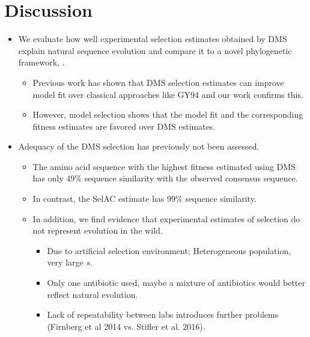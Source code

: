 \documentclass[12pt]{article}
\begin{document}
\section*{Discussion}
\begin{itemize}
	\item We evaluate how well experimental selection estimates obtained by DMS explain natural sequence evolution and compare it to a novel phylogenetic framework, \selac.
	\begin{itemize}
		\item Previous work has shown that DMS selection estimates can improve model fit over classical approaches like GY94 and our work confirms this.
		\item However, model selection shows that the \selac model fit and the corresponding fitness estimates are favored over DMS estimates.
	\end{itemize}

	\item Adequacy of the DMS selection has previously not been assessed.
	\begin{itemize}
		\item The amino acid sequence with the highest fitness estimated using DMS has only $49 \%$ sequence similarity with the observed consensus sequence.
		\item In contrast, the SelAC estimate has $99 \%$ sequence similarity. 
		\item In addition, we find evidence that experimental estimates of selection do not represent evolution in the wild.
 		\begin{itemize}
			\item Due to artificial selection environment; Heterogeneous population, very large $s$. 
			\item Only one antibiotic used, maybe a mixture of antibiotics would better reflect natural evolution.
			\item Lack of repeatability between labs introduces further problems (Firnberg et al 2014 vs. Stifler et al. 2016).
		\end{itemize}
	\end{itemize}


\end{itemize}
\end{document}

